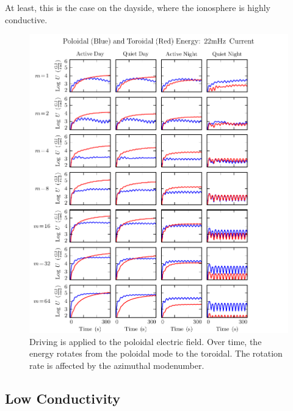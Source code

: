 At least, this is the case on the dayside, where the ionosphere is highly conductive. 


\begin{figure}[H]
    \centering
    \includegraphics[width=\textwidth]{figures/U_PT_022mHz.pdf}
    \caption[Poloidal and Toroidal Energy: Quiet Day]{
      Driving is applied to the poloidal electric field. Over time, the energy rotates from the poloidal mode to the toroidal. The rotation rate is affected by the azimuthal modenumber. 
    }
    \label{fig_U_PT_day}
\end{figure}

\subsection{Low Conductivity}


